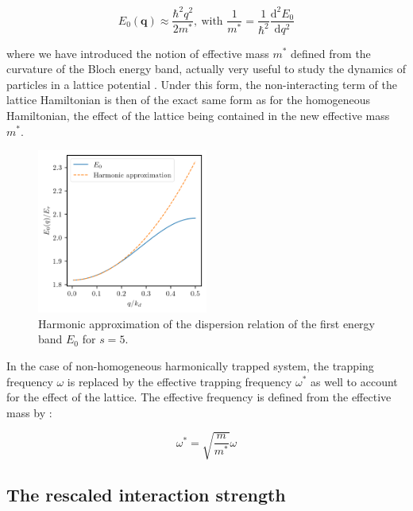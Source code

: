 \begin{equation}
    E_{0}(\bm{q}) \approx \frac{\hbar^2 q^2}{2 m^*}, \ \text{with } \frac{1}{m^*} = \frac{1}{\hbar^2} \frac{\mathrm{d}^2 E_0 }{\mathrm{d}q^2}
\end{equation}

\noindent where we have introduced the notion of effective mass $m^*$ defined from the curvature of the Bloch energy band, actually very useful to study the dynamics of particles in a lattice potential \cite{dalibard2013cages,kramer2002macroscopic}. Under this form, the non-interacting term of the lattice Hamiltonian is then of the exact same form as for the homogeneous Hamiltonian, the effect of the lattice being contained in the new effective mass $m^*$.

\begin{figure}
    \centering
    \includegraphics[width=0.5\textwidth]{Fig/Chapter2/dispersion_relation_harmonic.png}
    \caption{Harmonic approximation of the dispersion relation of the first energy band $E_0$ for $s=5$.}
    \label{fig:dispersion_relation_harmonic}
\end{figure}

In the case of non-homogeneous harmonically trapped system, the trapping frequency $\omega$ is replaced by the effective trapping frequency $\omega^*$ as well to account for the effect of the lattice. The effective frequency is defined from the effective mass by \cite{kramer2002macroscopic}:

\begin{equation}
    \omega^* = \sqrt{\frac{m}{m^*}} \omega
\end{equation}

\subsection{The rescaled interaction strength}

